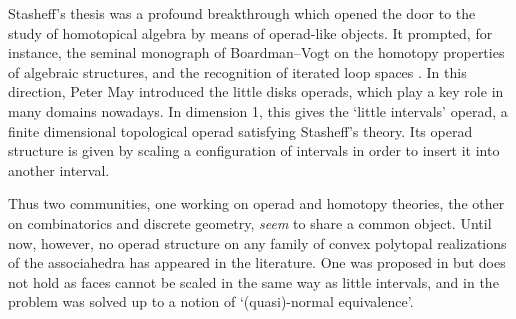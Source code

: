 Stasheff's thesis was a profound breakthrough which opened the door to the study of homotopical algebra by means of operad-like objects.
It prompted, for instance, the seminal monograph of Boardman--Vogt \cite{BoardmanVogt73} on the homotopy properties of algebraic structures, and the recognition of iterated loop spaces \cite{May72}. In this direction, Peter May introduced the little disks operads, which play a key role in many domains nowadays. In dimension 1, this gives the `little intervals' operad, a finite dimensional topological operad satisfying Stasheff's theory. Its operad structure is given by scaling a configuration of intervals in order to insert it into another interval.

Thus two communities, one working on operad and homotopy theories, the other on combinatorics and discrete geometry, \emph{seem} to share a common object. Until now, however, no operad structure on any family of convex polytopal realizations of the associahedra has appeared in the literature. One was proposed in \cite[Part~II \S1.6]{MSS} but does not hold as faces cannot be scaled in the same way as little intervals, and in \cite{AguiarArdila17} the problem was solved up to a notion of `(quasi)-normal equivalence'.

